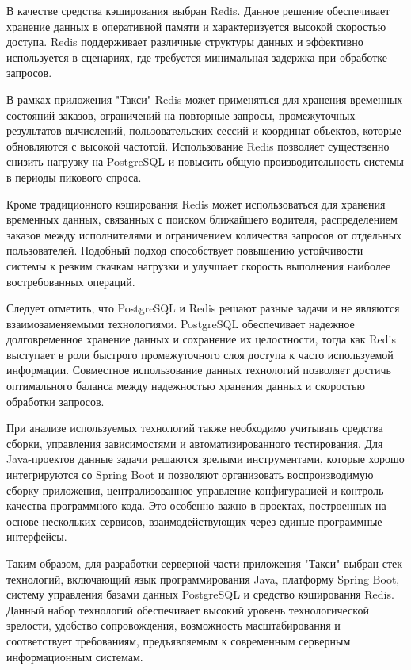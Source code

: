 {	\par \redline В качестве средства кэширования выбран Redis. Данное решение обеспечивает хранение данных в оперативной памяти и характеризуется высокой скоростью доступа. Redis поддерживает различные структуры данных и эффективно используется в сценариях, где требуется минимальная задержка при обработке запросов.
	
	\par \redline В рамках приложения "Такси"{} Redis может применяться для хранения временных состояний заказов, ограничений на повторные запросы, промежуточных результатов вычислений, пользовательских сессий и координат объектов, которые обновляются с высокой частотой. Использование Redis позволяет существенно снизить нагрузку на PostgreSQL и повысить общую производительность системы в периоды пикового спроса.
	
	\par \redline Кроме традиционного кэширования Redis может использоваться для хранения временных данных, связанных с поиском ближайшего водителя, распределением заказов между исполнителями и ограничением количества запросов от отдельных пользователей. Подобный подход способствует повышению устойчивости системы к резким скачкам нагрузки и улучшает скорость выполнения наиболее востребованных операций.
	
	\par \redline Следует отметить, что PostgreSQL и Redis решают разные задачи и не являются взаимозаменяемыми технологиями. PostgreSQL обеспечивает надежное долговременное хранение данных и сохранение их целостности, тогда как Redis выступает в роли быстрого промежуточного слоя доступа к часто используемой информации. Совместное использование данных технологий позволяет достичь оптимального баланса между надежностью хранения данных и скоростью обработки запросов.
	
	\par \redline При анализе используемых технологий также необходимо учитывать средства сборки, управления зависимостями и автоматизированного тестирования. Для Java-проектов данные задачи решаются зрелыми инструментами, которые хорошо интегрируются со Spring Boot и позволяют организовать воспроизводимую сборку приложения, централизованное управление конфигурацией и контроль качества программного кода. Это особенно важно в проектах, построенных на основе нескольких сервисов, взаимодействующих через единые программные интерфейсы.
	
	\par \redline Таким образом, для разработки серверной части приложения "Такси"{} выбран стек технологий, включающий язык программирования Java, платформу Spring Boot, систему управления базами данных PostgreSQL и средство кэширования Redis. Данный набор технологий обеспечивает высокий уровень технологической зрелости, удобство сопровождения, возможность масштабирования и соответствует требованиям, предъявляемым к современным серверным информационным системам.
	
}
	

